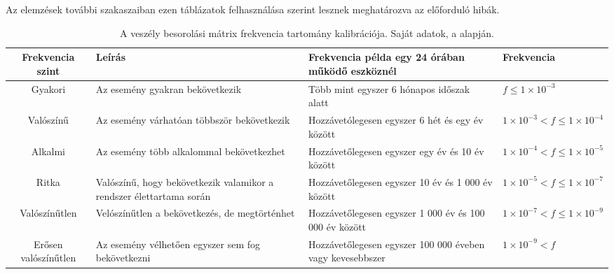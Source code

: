 Az elemzések további szakaszaiban ezen táblázatok felhasználása szerint lesznek meghatározva az előforduló hibák.
\begin{table}
    \footnotesize
    \centering
    \begin{tabular}{ |c|p{10em}|p{8em}|p{10em}| }
        \hline
        Frekvencia szint & Leírás & Frekvencia példa egy 24 órában működő eszköznél & Frekvencia \\
        \hline
        Gyakori & Az esemény gyakran bekövetkezik & Több mint egyszer 6 hónapos időszak alatt & $f \leq 1\times10^{-3}$ \\
        \hline
        Valószínű & Az esemény várhatóan többször bekövetkezik & Hozzávetólegesen egyszer 6 hét és egy év között & $ 1\times10^{-3} < f \leq 1\times10^{-4} $ \\
        \hline
        Alkalmi&Az esemény több alkalommal bekövetkezhet & Hozzávetőlegesen egyszer egy év és 10 év között & $1\times10^{-4} < f \leq 1\times10^{-5}$ \\
        \hline
        Ritka&Valószínű, hogy bekövetkezik valamikor a rendszer élettartama során & Hozzávetőlegesen egyszer 10 év és 1 000 év között & $1\times10^{-5} < f \leq 1\times10^{-7}$ \\
        \hline
        Valószínűtlen&Velószínűtlen a bekövetkezés, de megtörténhet & Hozzávetőlegesen egyszer 1 000 év és 100 000 év között & $1\times10^{-7} < f \leq 1\times10^{-9}$ \\
        \hline
        Erősen valószínűtlen&Az esemény vélhetően egyszer sem fog bekövetkezni & Hozzávetőlegesen egyszer 100 000 éveben vagy kevesebbszer & $1\times10^{-9} < f$ \\
        \hline
    \end{tabular}
    \caption{A veszély besorolási mátrix frekvencia tartomány kalibrációja. Saját adatok, a \cite{EN50126-1} alapján.}
    \label{tab:freqency}
\end{table}

